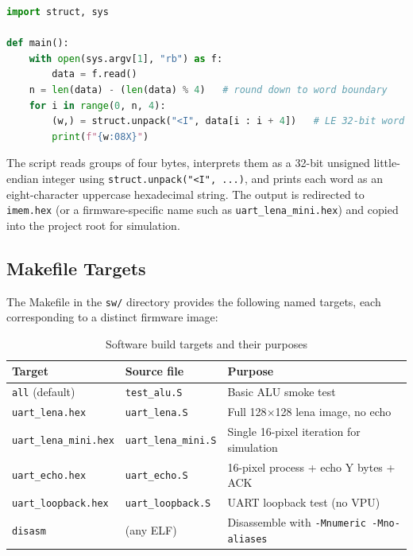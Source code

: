 \begin{lstlisting}[language=Python, caption={elf2hex\_lines.py: binary-to-hex converter for \$readmemh}]
import struct, sys

def main():
    with open(sys.argv[1], "rb") as f:
        data = f.read()
    n = len(data) - (len(data) % 4)   # round down to word boundary
    for i in range(0, n, 4):
        (w,) = struct.unpack("<I", data[i : i + 4])   # LE 32-bit word
        print(f"{w:08X}")
\end{lstlisting}

The script reads groups of four bytes, interprets them as a 32-bit unsigned
little-endian integer using \texttt{struct.unpack("<I", ...)}, and prints each word
as an eight-character uppercase hexadecimal string. The output is redirected to
\texttt{imem.hex} (or a firmware-specific name such as \texttt{uart\_lena\_mini.hex})
and copied into the project root for simulation.

\subsection{Makefile Targets}

The Makefile in the \texttt{sw/} directory provides the following named targets, each
corresponding to a distinct firmware image:

\begin{table}[H]
  \centering
  \caption{Software build targets and their purposes}
  \label{tab:make_targets}
  \begin{tabular}{lll}
    \toprule
    \textbf{Target} & \textbf{Source file} & \textbf{Purpose} \\
    \midrule
    \texttt{all} (default) & \texttt{test\_alu.S} & Basic ALU smoke test \\
    \texttt{uart\_lena.hex} & \texttt{uart\_lena.S} & Full 128$\times$128 lena image, no echo \\
    \texttt{uart\_lena\_mini.hex} & \texttt{uart\_lena\_mini.S} & Single 16-pixel iteration for simulation \\
    \texttt{uart\_echo.hex} & \texttt{uart\_echo.S} & 16-pixel process + echo Y bytes + ACK \\
    \texttt{uart\_loopback.hex} & \texttt{uart\_loopback.S} & UART loopback test (no VPU) \\
    \texttt{disasm} & (any ELF) & Disassemble with \texttt{-Mnumeric -Mno-aliases} \\
    \bottomrule
  \end{tabular}
\end{table}

